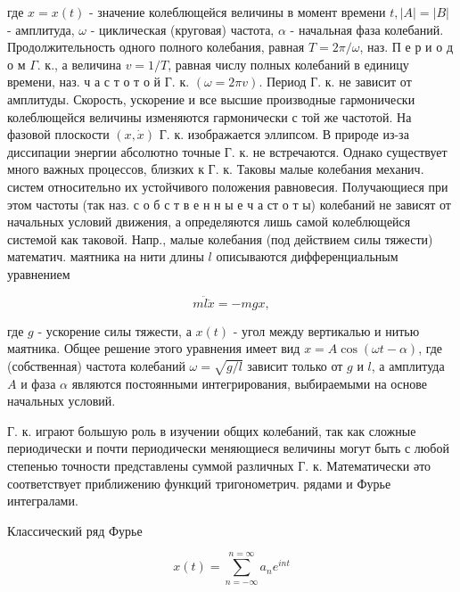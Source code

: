 \documentclass[10pt]{article}
\begin{document}
где $x=x(t)$ - значение колеблющейся величины в момент времени $t,|A|=|B|$ - амплитуда, $\omega$ - циклическая (круговая) частота, $\alpha$ - начальная фаза колебаний. Продолжительность одного полного колебания, равная $T=2 \pi / \omega$, наз. П е р и о д о м $\Gamma$. к., а величина $v=1 / T$, равная числу полных колебаний в единицу времени, наз. ч а с т о т о й $Г$. к. $(\omega=2 \pi v)$. Период Г. к. не зависит от амплитуды. Скорость, ускорение и все высшие производные гармонически колеблющейся величины изменяются гармонически с той же частотой. На фазовой плоскости $(x, \dot{x})$ Г. к. изображается эллипсом. В природе из-за диссипации энергии абсолютно точные Г. к. не встречаются. Однако существует много важных процессов, близких к Г. к. Таковы малые колебания механич. систем относительно их устойчивого положения равновесия. Получающиеся при этом частоты (так наз. с о б с т в е н н ы е ч а ст о т ы) колебаний не зависят от начальных условий движения, а определяются лишь самой колеблющейся системой как таковой. Напр., малые колебания (под действием силы тяжести) математич. маятника на нити длины $l$ описываются дифференциальным уравнением



\[

m \ddot{l} \ddot{x}=-m g x,

\]



где $g$ - ускорение силы тяжести, а $x(t)$ - угол между вертикалью и нитью маятника. Общее решение этого уравнения имеет вид $x=A \cos (\omega t-\alpha)$, где (собственная) частота колебаний $\omega=\sqrt{g / l}$ зависит только от $g$ и $l$, а амплитуда $A$ и фаза $\alpha$ являются постоянными интегрирования, выбираемыми на основе начальных условий.



Г. к. играют большую роль в изучении общих колебаний, так как сложные периодически и почти периодически меняющиеся величины могут быть с любой степенью точности представлены суммой различных Г. к. Математически әто соответствует приближению функций тригонометрич. рядами и Фурье интегралами.



Классический ряд Фурье



\[

x(t)=\sum_{n=-\infty}^{n=\infty} a_{n} e^{i n t}

\]
\end{document}
